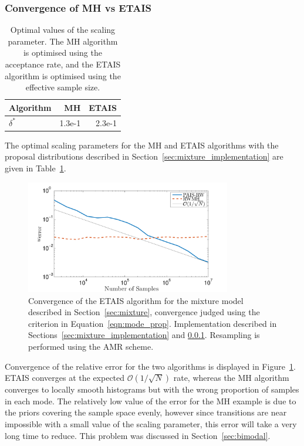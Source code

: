\documentclass[final]{siamltex}
\begin{document}
\subsubsection{Convergence of MH vs ETAIS}\label{sec:mixture_conv}

\begin{table}[!htb]
      \centering
        \begin{tabular}{|l|r|r|}
	\hline
	Algorithm	& MH & ETAIS \\ \hline
	$\delta^*$	& 1.3e-1     & 2.3e-1 \\
	\hline
	\end{tabular}
	\vspace{1mm}
	\caption{Optimal values of the scaling parameter. The MH algorithm is optimised using the acceptance rate, and the ETAIS algorithm is optimised using the effective sample size.}
	\label{table:mixture_opt_beta}
\end{table}

The optimal scaling parameters for the MH and ETAIS algorithms with the proposal distributions described in Section~\ref{sec:mixture_implementation} are given in Table~\ref{table:mixture_opt_beta}.

\begin{figure}[htb]
\centering
\includegraphics[width=0.8\textwidth]{"figures/Mode_proportions"}
\caption{Convergence of the ETAIS algorithm for the mixture model described in Section~\ref{sec:mixture}, convergence judged using the criterion in Equation~\eqref{eqn:mode_prop}. Implementation described in Sections~\ref{sec:mixture_implementation} and \ref{sec:mixture_conv}. Resampling is performed using the AMR scheme.}
\label{fig:mixture_modes}
\end{figure}

Convergence of the relative error for the two algorithms is displayed
in Figure~\ref{fig:mixture_modes}. ETAIS converges at the expected
$\mathcal{O}(1/\sqrt{N})$ rate, whereas the MH algorithm converges to
locally smooth histograms but with the wrong proportion of samples in
each mode. The relatively low value of the error for the MH example is
due to the priors covering the sample space evenly, however since
transitions are near impossible with a small value of the scaling
parameter, this error will take a very long time to reduce. This
problem was discussed in Section~\ref{sec:bimodal}.
\end{document}
